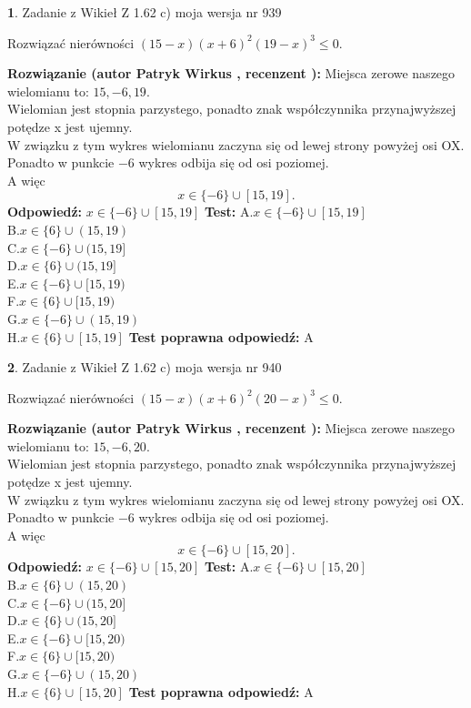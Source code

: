 \documentclass[12pt, a4paper]{article}
\theoremstyle{definition} %
\newtheorem{zad}{}
\newcommand{\zadStart}[1]{\begin{zad}#1\newline}
\newcommand{\zadStop}{\end{zad}}
\newcommand{\rozwStart}[2]{\noindent \textbf{Rozwiązanie (autor #1 , recenzent #2): }\newline}
\newcommand{\rozwStop}{\newline}
\newcommand{\odpStart}{\noindent \textbf{Odpowiedź:}\newline}
\newcommand{\odpStop}{\newline}
\newcommand{\testStart}{\noindent \textbf{Test:}\newline}
\newcommand{\testStop}{\newline}
\newcommand{\kluczStart}{\noindent \textbf{Test poprawna odpowiedź:}\newline}
\newcommand{\kluczStop}{\newline}
\begin{document}
\zadStart{Zadanie z Wikieł Z 1.62 c) moja wersja nr 939}

Rozwiązać nierówności $(15-x)(x+6)^{2}(19-x)^{3}\le0$.
\zadStop
\rozwStart{Patryk Wirkus}{}
Miejsca zerowe naszego wielomianu to: $15, -6, 19$.\\
Wielomian jest stopnia parzystego, ponadto znak współczynnika przy\linebreak najwyższej potędze x jest ujemny.\\ W związku z tym wykres wielomianu zaczyna się od lewej strony powyżej osi OX.\\
Ponadto w punkcie $-6$ wykres odbija się od osi poziomej.\\
A więc $$x \in \{-6\} \cup [15,19].$$
\rozwStop
\odpStart
$x \in \{-6\} \cup [15,19]$
\odpStop
\testStart
A.$x \in \{-6\} \cup [15,19]$\\
B.$x \in \{6\} \cup (15,19)$\\
C.$x \in \{-6\} \cup (15,19]$\\
D.$x \in \{6\} \cup (15,19]$\\
E.$x \in \{-6\} \cup [15,19)$\\
F.$x \in \{6\} \cup [15,19)$\\
G.$x \in \{-6\} \cup (15,19)$\\
H.$x \in \{6\} \cup [15,19]$
\testStop
\kluczStart
A
\kluczStop



\zadStart{Zadanie z Wikieł Z 1.62 c) moja wersja nr 940}

Rozwiązać nierówności $(15-x)(x+6)^{2}(20-x)^{3}\le0$.
\zadStop
\rozwStart{Patryk Wirkus}{}
Miejsca zerowe naszego wielomianu to: $15, -6, 20$.\\
Wielomian jest stopnia parzystego, ponadto znak współczynnika przy\linebreak najwyższej potędze x jest ujemny.\\ W związku z tym wykres wielomianu zaczyna się od lewej strony powyżej osi OX.\\
Ponadto w punkcie $-6$ wykres odbija się od osi poziomej.\\
A więc $$x \in \{-6\} \cup [15,20].$$
\rozwStop
\odpStart
$x \in \{-6\} \cup [15,20]$
\odpStop
\testStart
A.$x \in \{-6\} \cup [15,20]$\\
B.$x \in \{6\} \cup (15,20)$\\
C.$x \in \{-6\} \cup (15,20]$\\
D.$x \in \{6\} \cup (15,20]$\\
E.$x \in \{-6\} \cup [15,20)$\\
F.$x \in \{6\} \cup [15,20)$\\
G.$x \in \{-6\} \cup (15,20)$\\
H.$x \in \{6\} \cup [15,20]$
\testStop
\kluczStart
A
\kluczStop
\end{document}
